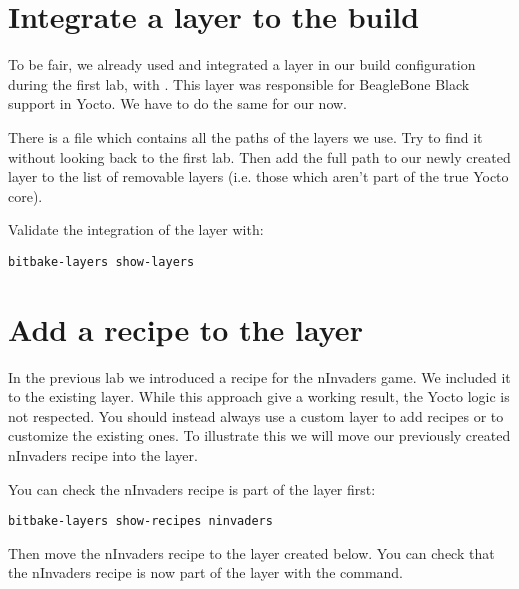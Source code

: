 \section{Integrate a layer to the build}

To be fair, we already used and integrated a layer in our build configuration
during the first lab, with . This layer was responsible for
BeagleBone Black support in Yocto. We have to do the same for our
 now.

There is a file which contains all the paths of the layers we use. Try to find it
without looking back to the first lab. Then add the full path to our newly
created layer to the list of removable layers (i.e. those which aren't part of
the true Yocto core).

Validate the integration of the  layer with:
\begin{verbatim}
bitbake-layers show-layers
\end{verbatim}

\section{Add a recipe to the layer}

In the previous lab we introduced a recipe for the nInvaders game. We included
it to the existing  layer. While this approach give a working result,
the Yocto logic is not respected. You should instead always use a custom layer
to add recipes or to customize the existing ones. To illustrate this we will
move our previously created nInvaders recipe into the  layer.

You can check the nInvaders recipe is part of the  layer first:
\begin{verbatim}
bitbake-layers show-recipes ninvaders
\end{verbatim}

Then move the nInvaders recipe to the layer created below. You can check that
the nInvaders recipe is now part of the  layer with the
 command.
